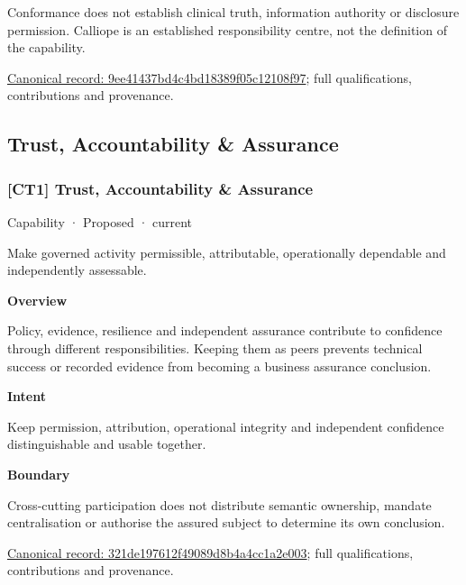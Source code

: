Conformance does not establish clinical truth, information authority or disclosure permission. Calliope is an established responsibility centre, not the definition of the capability.


{\footnotesize \href{../../../../continuum/strategy/capability/9ee41437bd4c4bd18389f05c12108f97.md}{Canonical record: 9ee41437bd4c4bd18389f05c12108f97}; full qualifications, contributions and provenance.}\par
\subsection{Trust, Accountability \& Assurance}

\subsubsection{[CT1] Trust, Accountability \& Assurance}

\label{element:321de197612f49089d8b4a4cc1a2e003}
{\small Capability · Proposed · current}\par

Make governed activity permissible, attributable, operationally dependable and independently assessable.



\textbf{Overview}



Policy, evidence, resilience and independent assurance contribute to confidence through different responsibilities. Keeping them as peers prevents technical success or recorded evidence from becoming a business assurance conclusion.



\textbf{Intent}



Keep permission, attribution, operational integrity and independent confidence distinguishable and usable together.



\textbf{Boundary}



Cross-cutting participation does not distribute semantic ownership, mandate centralisation or authorise the assured subject to determine its own conclusion.


{\footnotesize \href{../../../../continuum/strategy/capability/321de197612f49089d8b4a4cc1a2e003.md}{Canonical record: 321de197612f49089d8b4a4cc1a2e003}; full qualifications, contributions and provenance.}\par
